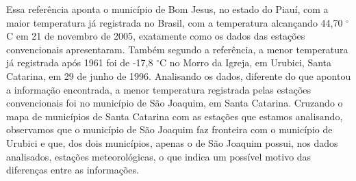 Essa referência aponta o município de Bom Jesus, no estado do Piauí, com a maior temperatura já registrada no Brasil, com a temperatura alcançando 44,70 $^{\circ}$C em 21 de novembro de 2005, exatamente como os dados das estações convencionais apresentaram.  Também segundo a referência, a menor temperatura já registrada após 1961 foi de -17,8 $^{\circ}$C no Morro da Igreja, em Urubici, Santa Catarina, em 29 de junho de 1996. Analisando os dados, diferente do que apontou a informação encontrada, a menor temperatura registrada pelas estações convencionais foi no município de São Joaquim, em Santa Catarina. Cruzando o mapa de municípios de Santa Catarina com as estações que estamos analisando, observamos que o município de São Joaquim faz fronteira com o município de Urubici e que, dos dois municípios, apenas o de São Joaquim possui, nos dados analisados, estações meteorológicas, o que indica um possível motivo das diferenças entre as informações.

\renewcommand{\cleardoublepage}{}
\renewcommand{\clearpage}{}
\vspace{5mm}